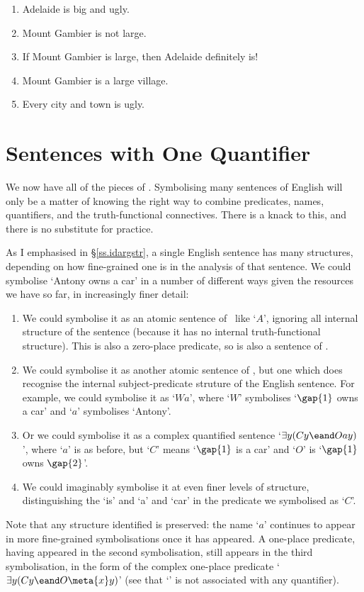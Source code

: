 \begin{enumerate}
	\item Adelaide is big and ugly.
	\item Mount Gambier is not large.
	\item If Mount Gambier is large, then Adelaide definitely is!
	\item Mount Gambier is a large village.
	\item Every city and town is ugly.
\end{enumerate}

\chapter{Sentences with One Quantifier}\label{s:MoreMonadic}
We now have all of the pieces of \FOL. Symbolising many sentences of English will only be a matter of knowing the right way to combine predicates, names, quantifiers, and the truth-functional connectives. There is a knack to this, and there is no substitute for practice.

As I emphasised in §\ref{ss.idargstr}, a single English sentence has many structures, depending on how fine-grained one is in the analysis of that sentence. We could symbolise `Antony owns a car' in a number of different ways given the resources we have so far, in increasingly finer detail: \begin{enumerate}
	\item We could symbolise it as an atomic sentence of \TFL\ like `$A$', ignoring all internal structure of the sentence (because it has no internal truth-functional structure). This is also a zero-place predicate, so is also a sentence of \FOL. 
	\item We could symbolise it as another atomic sentence of \FOL, but one which does recognise the internal subject-predicate struture of the English sentence. For example, we could symbolise it as `$Wa$', where `$W$' symbolises `$\gap{1}$ owns a car' and `$a$' symbolises `Antony'.
	\item Or we could symbolise it as a complex quantified sentence `$\exists y (Cy \eand Oay)$', where `$a$' is as before, but `$C$' means `$\gap{1}$ is a car' and `$O$' is `$\gap{1}$ owns $\gap{2}$'.
	\item We could imaginably symbolise it at even finer levels of structure, distinguishing the `is' and `a' and `car' in the predicate we symbolised as `$C$'.
\end{enumerate} Note that any structure identified is preserved: the name `$a$' continues to appear in more fine-grained symbolisations once it has appeared. A one-place predicate, having appeared in the second symbolisation, still appears in the third symbolisation, in the form of the complex one-place predicate `$\exists y (Cy \eand O\meta{x}y)$' (see that `' is not associated with any quantifier).


